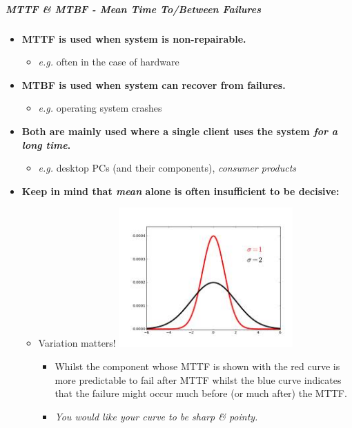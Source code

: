 \documentclass[a4paper]{article}
\providecommand{\tightlist}{%
  \setlength{\itemsep}{0pt}\setlength{\parskip}{0pt}}
\let\oldsubparagraph\subparagraph
\renewcommand{\subparagraph}[1]{\oldsubparagraph{#1}\mbox{}}
\begin{document}
\hypertarget{mttf--mtbf---mean-time-tobetween-failures}{%
\subparagraph{MTTF \& MTBF - Mean Time To/Between
Failures}\label{mttf--mtbf---mean-time-tobetween-failures}}

\begin{itemize}
\item
  \textbf{MTTF is used when system is non-repairable.}

  \begin{itemize}
  \tightlist
  \item
    \emph{e.g.} often in the case of hardware
  \end{itemize}
\item
  \textbf{MTBF is used when system can recover from failures.}

  \begin{itemize}
  \tightlist
  \item
    \emph{e.g.} operating system crashes
  \end{itemize}
\item
  \textbf{Both are mainly used where a single client uses the system
  \emph{for a long time}.}

  \begin{itemize}
  \tightlist
  \item
    \emph{e.g.} desktop PCs (and their components), \emph{consumer
    products}
  \end{itemize}
\item
  \textbf{Keep in mind that \emph{mean} alone is often insufficient to
  be decisive:}

  \begin{itemize}
  \tightlist
  \item
    Variation matters! \includegraphics{2C-SE.assets/1543667647524.png}

    \begin{itemize}
    \tightlist
    \item
      Whilst the component whose MTTF is shown with the red curve is
      more predictable to fail after MTTF whilst the blue curve
      indicates that the failure might occur much before (or much after)
      the MTTF.
    \item
      \emph{You would like your curve to be sharp \& pointy.}
    \end{itemize}
  \end{itemize}
\end{itemize}
\end{document}
